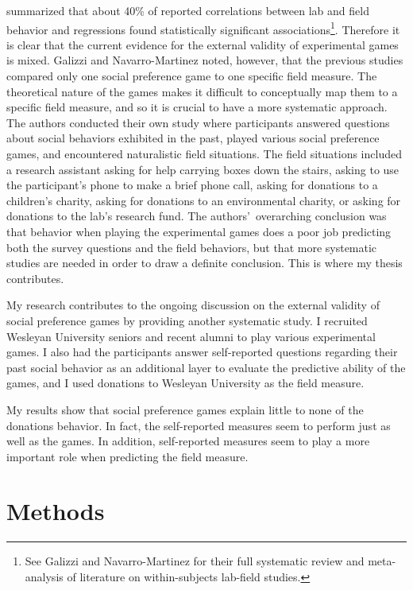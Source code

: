 \documentclass[12pt]{article}
\begin{document}
\cite{galizzi_navarro-martinez_2017} summarized that about 40\% of reported correlations between lab and field behavior and regressions found statistically significant associations\footnote{See Galizzi and Navarro-Martinez for their full systematic review and meta-analysis of literature on within-subjects lab-field studies.}. Therefore it is clear that the current evidence for the external validity of experimental games is mixed. Galizzi and Navarro-Martinez noted, however, that the previous studies compared only one social preference game to one specific field measure. The theoretical nature of the games makes it difficult to conceptually map them to a specific field measure, and so it is crucial to have a more systematic approach. The authors conducted their own study where participants answered questions about social behaviors exhibited in the past, played various social preference games, and encountered naturalistic field situations. The field situations included a research assistant asking for help carrying boxes down the stairs, asking to use the participant\rq s phone to make a brief phone call, asking for donations to a children\rq s charity, asking for donations to an environmental charity, or asking for donations to the lab\rq s research fund.  The authors\rq \ overarching conclusion was that behavior when playing the experimental games does a poor job predicting both the survey questions and the field behaviors, but that more systematic studies are needed in order to draw a definite conclusion. This is where my thesis contributes.

My research contributes to the ongoing discussion on the external validity of social preference games by providing another systematic study. I recruited Wesleyan University seniors and recent alumni to play various experimental games. I also had the participants answer self-reported questions regarding their past social behavior as an additional layer to evaluate the predictive ability of the games, and I used donations to Wesleyan University as the field measure.

{\color{red}My results show that social preference games explain little to none of the donations behavior. In fact, the self-reported measures seem to perform just as well as the games. In addition, self-reported measures seem to play a more important role when predicting the field measure.}



\section{Methods}
\end{document}
